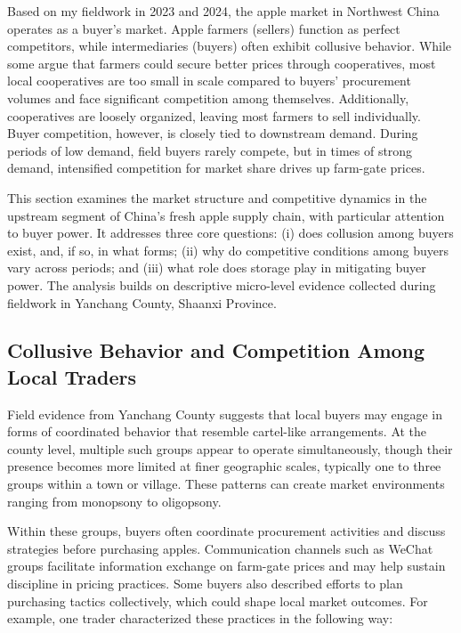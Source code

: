 Based on my fieldwork in 2023 and 2024, the apple market in Northwest China operates as a buyer's market. Apple farmers (sellers) function as perfect competitors, while intermediaries (buyers) often exhibit collusive behavior. While some argue that farmers could secure better prices through cooperatives, most local cooperatives are too small in scale compared to buyers' procurement volumes and face significant competition among themselves. Additionally, cooperatives are loosely organized, leaving most farmers to sell individually. Buyer competition, however, is closely tied to downstream demand. During periods of low demand, field buyers rarely compete, but in times of strong demand, intensified competition for market share drives up farm-gate prices.

This section examines the market structure and competitive dynamics in the upstream segment of China's fresh apple supply chain, with particular attention to buyer power. It addresses three core questions: (i) does collusion among buyers exist, and, if so, in what forms; (ii) why do competitive conditions among buyers vary across periods; and (iii) what role does storage play in mitigating buyer power. The analysis builds on descriptive micro-level evidence collected during fieldwork in Yanchang County, Shaanxi Province.


\subsection{Collusive Behavior and Competition Among Local Traders}
\noindent 
Field evidence from Yanchang County suggests that local buyers may engage in forms of coordinated behavior that resemble cartel-like arrangements. At the county level, multiple such groups appear to operate simultaneously, though their presence becomes more limited at finer geographic scales, typically one to three groups within a town or village. These patterns can create market environments ranging from monopsony to oligopsony.

Within these groups, buyers often coordinate procurement activities and discuss strategies before purchasing apples. Communication channels such as WeChat groups facilitate information exchange on farm-gate prices and may help sustain discipline in pricing practices. Some buyers also described efforts to plan purchasing tactics collectively, which could shape local market outcomes. For example, one trader characterized these practices in the following way:

\begin{quote}
\end{quote}

